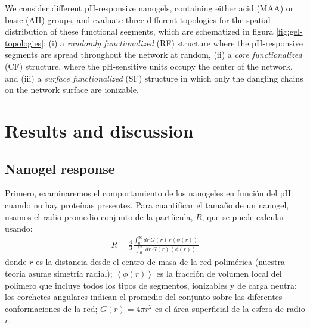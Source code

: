 We consider different pH-responsive nanogels, containing either acid (MAA) or basic (AH) groups, and evaluate three different topologies for the spatial distribution of these functional  segments, which are schematized in figura \ref{fig:gel-topologies}: 
(i) a \emph{randomly functionalized} (RF) structure where the pH-responsive segments are spread throughout the network  at random,
(ii) a \emph{core functionalized} (CF) structure, where the  pH-sensitive units occupy the center of the network, and 
(iii) a \emph{surface functionalized} (SF) structure in which only the dangling chains on the network surface  are ionizable. 

 
 
  







\section{Results and discussion}






\subsection{Nanogel response}
Primero, examinaremos el comportamiento de los nanogeles en funci\'on del pH cuando no hay prote\'inas presentes.
Para cuantificar el tama\~no de un nanogel, usamos el radio promedio conjunto de la partí\'icula, $R$, que se puede calcular usando:
\begin{align}
    R= \frac{4}{3}\frac{\int_0^\infty{dr\,G(r)\,r \left<\phi(r)\right>}}{\int_0^\infty{dr\,G(r)\left<\phi(r)\right>}}
\end{align}
donde $r$ es la distancia desde el centro de masa de la red polim\'erica (nuestra teor\'ia asume simetr\'ia radial);
$\left<\phi(r)\right>$ es la fracci\'on de volumen local del pol\'imero que incluye todos los tipos de segmentos, ionizables y de carga neutra;
los corchetes angulares indican el promedio del conjunto sobre las diferentes conformaciones de la red;
$G(r)=4\pi r^2$ es el \'area superficial de la esfera de radio $r$.


